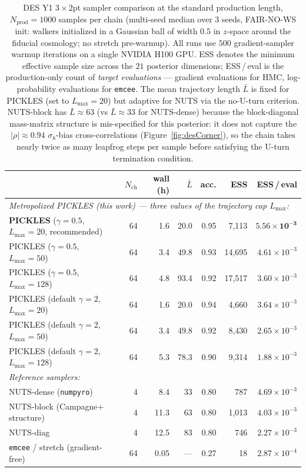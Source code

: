 \documentclass{article}
\begin{document}
\begin{table}[t]
\centering
\caption{DES Y1 $3\times 2$pt sampler comparison at the standard
production length, $N_{\text{prod}} = 1000$ samples per chain
(multi-seed median over $3$ seeds, FAIR-NO-WS init: walkers initialized
in a Gaussian ball of width $0.5$ in $z$-space around the fiducial
cosmology; no stretch pre-warmup). All runs use $500$ gradient-sampler
warmup iterations on a single NVIDIA H100 GPU. ESS denotes the
minimum effective sample size across the $21$ posterior dimensions;
ESS\,/\,eval is the production-only count of \emph{target evaluations}
— gradient evaluations for HMC, log-probability evaluations for
\texttt{emcee}. The mean trajectory length $\bar L$ is fixed for
PICKLES (set to $L_{\max}=20$) but adaptive for NUTS via the
no-U-turn criterion. NUTS-block has $\bar L \approx 63$ (vs $\bar
L \approx 33$ for NUTS-dense) because the block-diagonal mass-matrix
structure is mis-specified for this posterior: it does not capture
the $|\rho| \approx 0.94$ $\sigma_8$-bias cross-correlations
(Figure~\ref{fig:desCorner}), so the chain takes nearly twice as
many leapfrog steps per sample before satisfying the U-turn
termination condition.}
\label{tab:desMainN1k}
\small
\begin{tabular}{l rrrr rr}
\toprule
& $N_{\text{ch}}$ & wall (h) & $\bar L$ & acc.
& ESS & ESS\,/\,eval \\
\midrule
\multicolumn{7}{l}{\emph{Metropolized PICKLES (this work) — three values of the trajectory cap $L_{\max}$:}} \\
\textbf{PICKLES} ($\gamma=0.5$, $L_{\max}=20$, recommended)
   & 64 & 1.6 & 20.0 & 0.95
   & 7{,}113 & $\mathbf{5.56\!\times\!10^{-3}}$ \\
PICKLES ($\gamma=0.5$, $L_{\max}=50$)
   & 64 & 3.4 & 49.8 & 0.93
   & 14{,}695 & $4.61\!\times\!10^{-3}$ \\
PICKLES ($\gamma=0.5$, $L_{\max}=128$)
   & 64 & 4.8 & 93.4 & 0.92
   & 17{,}517 & $3.60\!\times\!10^{-3}$ \\
PICKLES (default $\gamma=2$, $L_{\max}=20$)
   & 64 & 1.6 & 20.0 & 0.94
   & 4{,}660 & $3.64\!\times\!10^{-3}$ \\
PICKLES (default $\gamma=2$, $L_{\max}=50$)
   & 64 & 3.4 & 49.8 & 0.92
   & 8{,}430 & $2.65\!\times\!10^{-3}$ \\
PICKLES (default $\gamma=2$, $L_{\max}=128$)
   & 64 & 5.3 & 78.3 & 0.90
   & 9{,}314 & $1.88\!\times\!10^{-3}$ \\
\midrule
\multicolumn{7}{l}{\emph{Reference samplers:}} \\
NUTS-dense (\texttt{numpyro})
   & 4 & 8.4 & 33 & 0.80
   &   787 & $4.69\!\times\!10^{-3}$ \\
NUTS-block (Campagne+ structure)
   & 4 & 11.3 & 63 & 0.80
   & 1{,}013 & $4.03\!\times\!10^{-3}$ \\
NUTS-diag
   & 4 & 12.5 & 83 & 0.80
   &   746 & $2.27\!\times\!10^{-3}$ \\
\texttt{emcee} / stretch (gradient-free)
   & 64 & 0.05 & --- & 0.27
   &     18 & $2.87\!\times\!10^{-4}$ \\
\bottomrule
\end{tabular}
\end{table}
\end{document}
